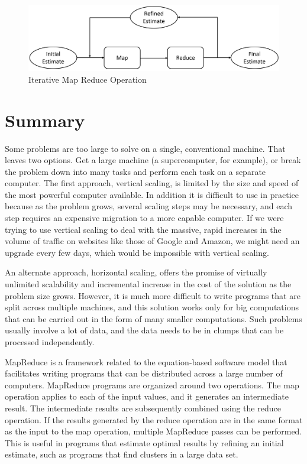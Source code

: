 \begin{figure}
    \begin{center}
        \includegraphics[scale=0.2]{images/iterative-map-reduce-rev}
    \end{center}
    \caption{Iterative Map Reduce Operation}
    \label{iterative-map-reduce}
\end{figure}

\section{Summary}

Some problems are too large to solve on a single, conventional machine.
That leaves two options.
Get a large machine (a supercomputer, for example),
or break the problem down into many tasks and
perform each task on a separate computer.
The first approach,
vertical scaling,
is limited by the size and speed of the most powerful computer available.
In addition it is difficult to use in practice because as the problem grows,
several scaling steps may be necessary,
and each step requires an expensive migration to a more capable computer.
If we were trying to use vertical scaling to deal with the massive,
rapid increases in the volume of traffic on websites
like those of Google and Amazon,
we might need an upgrade every few days,
which would be impossible with vertical scaling.

An alternate approach,
horizontal scaling,
offers the promise of virtually unlimited
scalability and incremental increase
in the cost of the solution as the problem size grows.
However, it is much more difficult
to write programs that are split across multiple machines,
and this solution works only
for big computations that can be carried out
in the form of many smaller computations.
Such problems usually involve a lot of data,
and the data needs to be in clumps
that can be processed independently.

MapReduce
is a framework related
to the equation-based software model that facilitates writing
programs that can be distributed across a large number of computers.
MapReduce programs are organized around two operations.
The map operation applies to each of the input values, and
it generates an intermediate result.
The intermediate results are subsequently combined using the reduce operation.
If the results generated by the reduce operation are in the same format
as the input to the map operation, multiple MapReduce passes can be performed.
This is useful in programs that estimate optimal results by refining an initial estimate,
such as programs that find clusters in a large data set.


